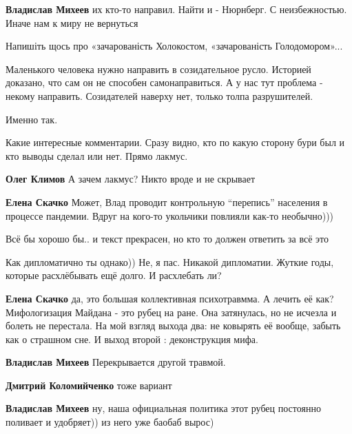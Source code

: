 \begin{itemize}
\begin{itemize}
\textbf{Владислав Михеев} их кто-то направил. Найти и - Нюрнберг. С неизбежностью. Иначе нам к миру не вернуться
\end{itemize} %

Напишіть щось про «зачарованість Холокостом, «зачарованість Голодомором»...


Маленького человека нужно направить в созидательное русло. Историей доказано,
что сам он не способен самонаправиться. А у нас тут проблема - некому направить.
Созидателей наверху нет, только толпа разрушителей.


Именно так.

Какие интересные комментарии. Сразу видно, кто по какую сторону бури был и кто выводы сделал или нет. Прямо лакмус.

\begin{itemize} %
\textbf{Олег Климов} А зачем лакмус? Никто вроде и не скрывает

\textbf{Елена Скачко} Может, Влад проводит контрольную \enquote{перепись} населения в процессе пандемии. Вдруг на кого-то укольчики повлияли как-то необычно)))
\end{itemize} %

Всё бы хорошо бы.. и текст прекрасен, но кто то должен ответить за всё это


Как дипломатично ты однако)) Не, я пас. Никакой дипломатии. Жуткие годы,
которые расхлёбывать ещё долго. И расхлебать ли?

\begin{itemize} %
\textbf{Елена Скачко} да, это большая
коллективная психотравмма. А лечить её как? Мифологизация Майдана - это рубец на ране. Она затянулась, но не исчезла и болеть не перестала. На мой взгляд выхода два: не ковырять её вообще, забыть как о страшном сне. И выход второй : деконструкция мифа.

\textbf{Владислав Михеев} Перекрывается другой травмой.

\textbf{Дмитрий Коломийченко} тоже вариант

\textbf{Владислав Михеев} ну, наша официальная политика этот рубец постоянно поливает и удобряет)) из него уже баобаб вырос)
\end{itemize} %


\end{itemize}

